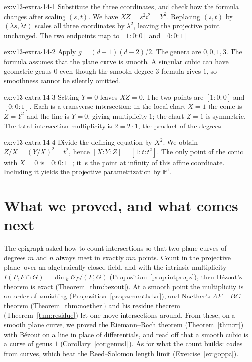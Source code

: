 \begin{solution}{ex:v13-extra-14-1}
\idea Substitute the three coordinates, and check how the formula changes after scaling $(s,t)$.
\writeup We have $XZ=s^2t^2=Y^2$. Replacing $(s,t)$ by $(\lambda s,\lambda t)$ scales all three coordinates by $\lambda^2$, leaving the projective point unchanged. The two endpoints map to $[1:0:0]$ and $[0:0:1]$.
\end{solution}

\begin{solution}{ex:v13-extra-14-2}
\idea Apply $g=(d-1)(d-2)/2$.
\writeup The genera are $0,0,1,3$. The formula assumes that the plane curve is smooth. A singular cubic can have geometric genus $0$ even though the smooth degree-$3$ formula gives $1$, so smoothness cannot be silently omitted.
\end{solution}

\begin{solution}{ex:v13-extra-14-3}
\idea Setting $Y=0$ leaves $XZ=0$.
\writeup The two points are $[1:0:0]$ and $[0:0:1]$. Each is a transverse intersection: in the local chart $X=1$ the conic is $Z=Y^2$ and the line is $Y=0$, giving multiplicity $1$; the chart $Z=1$ is symmetric. The total intersection multiplicity is $2=2\cdot1$, the product of the degrees.
\end{solution}

\begin{solution}{ex:v13-extra-14-4}
\idea Divide the defining equation by $X^2$.
\writeup We obtain $Z/X=(Y/X)^2=t^2$, hence $[X:Y:Z]=[1:t:t^2]$. The only point of the conic with $X=0$ is $[0:0:1]$; it is the point at infinity of this affine coordinate. Including it yields the projective parametrization by $\mathbb P^1$.
\end{solution}

\section{What we proved, and what comes next}

The epigraph asked how to count intersections so that two plane curves of degrees $m$ and $n$ always meet in exactly $mn$ points. Count
in the projective plane, over an algebraically closed field, and with the intrinsic multiplicity $I(P,F\cap G)=\dim_k\mathcal O_P/(F,G)$
(Proposition~\ref{prop:intprops}); then B\'ezout's theorem is exact (Theorem~\ref{thm:bezout}). At a smooth point the multiplicity is
an order of vanishing (Proposition~\ref{prop:smoothdvr}), and Noether's $AF+BG$ theorem (Theorem~\ref{thm:noether}) and his residue
theorem (Theorem~\ref{thm:residue}) let one move intersections around. From these, on a smooth plane curve, we proved the
Riemann--Roch theorem (Theorem~\ref{thm:rr}) with B\'ezout on a line in place of differentials, and read off that a smooth cubic is a
curve of genus $1$ (Corollary~\ref{cor:genus1}). As for what the count builds: codes from curves, which beat the Reed--Solomon length
limit (Exercise~\ref{ex:goppa}).

